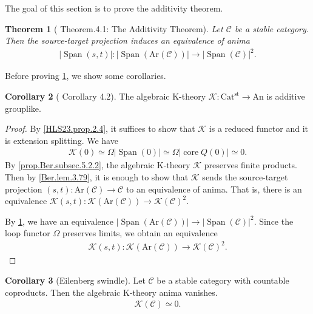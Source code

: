 \documentclass[a4paper,dvipdfmx,11pt,reqno]{amsart}
\newcommand{\C}{\mathcal{C}}
\newcommand{\K}{\mathcal{K}}
\DeclareMathOperator{\core}{core}
\DeclareMathOperator{\Span}{Span}
\newcommand{\An}{\mathrm{An}}
\newcommand{\Catst}{\mathrm{Cat^{st}}}
\newcommand{\Ar}{\mathrm{Ar}}
\newtheorem{theorem}{Theorem}[section]
\theoremstyle{definition}
\newtheorem{corollary}[theorem]{Corollary}
\begin{document}
The goal of this section is to prove the additivity theorem.

\begin{theorem}[\cite{HLS23} Theorem.4.1: The Additivity Theorem] \label{thrm.additivity_theorem}
  Let $\C$ be a stable category.
  Then the source-target projection induces an equivalence of anima 
  \begin{align*}
    |\Span(s,t)| : |\Span(\Ar(\C))| \to |\Span(\C)|^2.
  \end{align*}
\end{theorem}

Before proving \cref{thrm.additivity_theorem}, we show some corollaries.

\begin{corollary}[\cite{HLS23} Corollary 4.2] \label{HLS23.cor.3.2}
  The algebraic K-theory $\K : \Catst \to \An$ is additive grouplike.
\end{corollary}

\begin{proof}
  By \cref{HLS23.prop.2.4}, it suffices to show that $\K$ is a reduced functor and it is extension splitting.
  We have 
  \begin{align*}
    \K(0) \simeq \Omega|\Span(0)| \simeq \Omega|\core Q(0)| \simeq 0.
  \end{align*}
  By \cref{prop.Ber.subsec.5.2.2}, the algebraic K-theory $\K$ preserves finite products.
  Then by \cref{Ber.lem.3.79}, it is enough to show that $\K$ sends the source-target projection $(s,t) : \Ar(\C) \to \C$ to an equivalence of anima.
  That is, there is an equivalence $\K(s,t) : \K(\Ar(\C)) \to \K(\C)^2$.
  
  By \cref{thrm.additivity_theorem}, we have an equivalence $|\Span(\Ar(\C))| \to |\Span(\C)|^2$.
  Since the loop functor $\Omega$ preserves limits, we obtain an equivalence
  \begin{align*}
    \K(s,t) : \K(\Ar(\C)) \to \K(\C)^2.
  \end{align*}
\end{proof}

\begin{corollary}[Eilenberg swindle] \label{Ber.prop.A.4}
  Let $\C$ be a stable category with countable coproducts.
  Then the algebraic K-theory anima vanishes.
  \begin{align*}
    \K(\C) \simeq 0.
  \end{align*}
\end{corollary}
\end{document}
